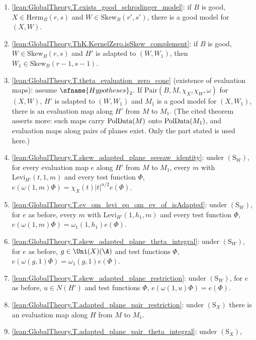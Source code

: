 \begin{enumerate}[resume*=thmKconeD]
\item\label{pf:thmK-cone:D-model} \cref{lean:GlobalTheory.T.exists_good_schrodinger_model}: if $B$ is good,
  $X\in\mathrm{Herm}_B(r,s)$ and $W\in\mathrm{Skew}_B(r',s')$, there is a good model for $(X,W)$.
\item\label{pf:thmK-cone:D-skew} \cref{lean:GlobalTheory.ThK.KernelZero.isSkew_complement}: if $B$ is good,
  $W\in\mathrm{Skew}_B(r,s)$ and $H'$ is adapted to $(W,W_1)$, then $W_1\in\mathrm{Skew}_B(r-1,s-1)$.
\item\label{pf:thmK-cone:D-evzero} \cref{lean:GlobalTheory.T.theta_evaluation_zero_cone} (existence of evaluation
  maps): assume $\sfname{Hypotheses}_2$.  If $\mathrm{Pair}(B,M,\chi_X,\chi_W,\omega)$ for $(X,W)$, $H'$ is adapted to
  $(W,W_1)$ and $M_1$ is a good model for $(X,W_1)$, there is an evaluation map along $H'$ from $M$ to $M_1$.  (The
  cited theorem asserts more: such maps carry $\operatorname{PolData}(M)$ onto $\operatorname{PolData}(M_1)$, and evaluation maps along pairs
  of planes exist.  Only the part stated is used here.)
\item\label{pf:thmK-cone:D-torusW} \cref{lean:GlobalTheory.T.skew_adapted_plane_seesaw_identity}: under
  $(\mathrm{S}_W)$, for every evaluation map $e$ along $H'$ from $M$ to $M_1$, every $m$ with $\mathrm{Levi}_{H'}(t,1,m)$
  and every test function $\Phi$, $e(\omega(1,m)\Phi)=\chi_X(t)|t|^{n/2}e(\Phi)$.
\item\label{pf:thmK-cone:D-leviW} \cref{lean:GlobalTheory.T.ev_om_levi_eq_om_ev_of_isAdapted}: under $(\mathrm{S}_W)$,
  for $e$ as before, every $m$ with $\mathrm{Levi}_{H'}(1,h_1,m)$ and every test function $\Phi$,
  $e(\omega(1,m)\Phi)=\omega_1(1,h_1)e(\Phi)$.
\item\label{pf:thmK-cone:D-leftW} \cref{lean:GlobalTheory.T.skew_adapted_plane_theta_integral}: under
  $(\mathrm{S}_W)$, for $e$ as before, $g\in\Uni(X)(\A)$ and test functions $\Phi$, $e(\omega(g,1)\Phi)=\omega_1(g,1)e(\Phi)$.
\item\label{pf:thmK-cone:D-unipW} \cref{lean:GlobalTheory.T.skew_adapted_plane_restriction}: under $(\mathrm{S}_W)$, for
  $e$ as before, $u\in N(H')$ and test functions $\Phi$, $e(\omega(1,u)\Phi)=e(\Phi)$.
\item\label{pf:thmK-cone:D-evX} \cref{lean:GlobalTheory.T.adapted_plane_pair_restriction}: under $(\mathrm{S}_X)$ there
  is an evaluation map along $H$ from $M$ to $M_1$.
\item\label{pf:thmK-cone:D-unipX} \cref{lean:GlobalTheory.T.adapted_plane_pair_theta_integral}: under $(\mathrm{S}_X)$,

\end{enumerate}
